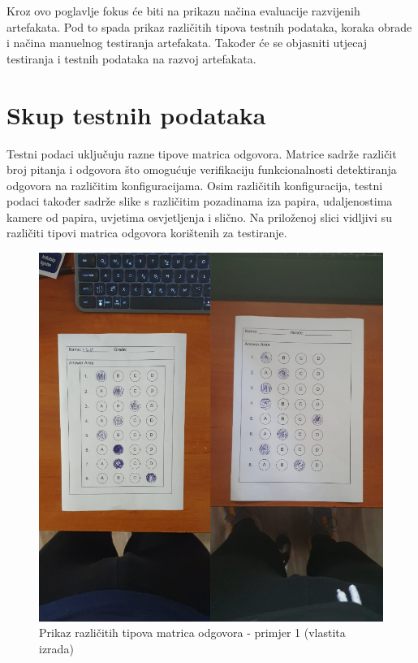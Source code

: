 \documentclass{foi}
\begin{document}
Kroz ovo poglavlje fokus će biti na prikazu načina evaluacije razvijenih artefakata. Pod to spada prikaz različitih tipova testnih podataka, koraka obrade i načina manuelnog testiranja artefakata. Također će se objasniti utjecaj testiranja i testnih podataka na razvoj artefakata.

\section{Skup testnih podataka}

Testni podaci uključuju razne tipove matrica odgovora. Matrice sadrže različit broj pitanja i odgovora što omogućuje verifikaciju funkcionalnosti detektiranja odgovora na različitim konfiguracijama. Osim različitih konfiguracija, testni podaci također sadrže slike s različitim pozadinama iza papira, udaljenostima kamere od papira, uvjetima osvjetljenja i slično. Na priloženoj slici vidljivi su različiti tipovi matrica odgovora korištenih za testiranje.

\begin{figure}[H]
\centering
\includegraphics[width=0.8\linewidth]{slike/Test1.png}
\caption{Prikaz različitih tipova matrica odgovora - primjer 1 (vlastita izrada)}
\end{figure}
\end{document}
